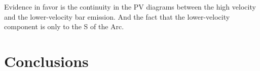\documentclass[useAMS, usenatbib]{mnras}
\newcounter{ionstage}
\renewcommand{\ion}[2]{\setcounter{ionstage}{#2}%
  \ensuremath{\mathrm{#1\,\scriptstyle\Roman{ionstage}}}}
\begin{document}
Evidence in favor is the continuity in the PV diagrams between the high velocity and the lower-velocity bar emission.
And the fact that the lower-velocity component is only to the S of the Arc. 







\section{Conclusions}
\label{sec:conclusions}





\bsp	%
\label{lastpage}
\end{document}
